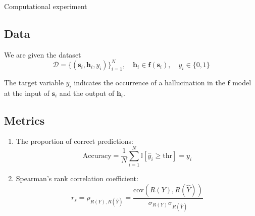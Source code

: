 \documentclass{beamer}
\begin{document}
\begin{frame}{Computational experiment}

\subsection{Data}

We are given the dataset
\[\mathcal{D} = \{(\mathbf{s}_i, \mathbf{h}_i, y_i) \}_{i=1}^N, \quad \mathbf{h}_i \in \mathbf{f}(\mathbf{s}_i), \quad y_i \in \{0, 1\}\]

The target variable $y_i$ indicates the occurrence of a hallucination in the $\mathbf{f}$ model at the input of $\mathbf{s}_i$ and the output of $\mathbf{h}_i$.

\subsection{Metrics}

\begin{enumerate}
    \item The proportion of correct predictions:
    \[\text{Accuracy} = \frac1N \sum\limits_{i=1}^N \mathbb{I}[\hat{y}_i \ge \text{thr}] = y_i\]
    \item Spearman's rank correlation coefficient:
    \[r_s= \rho_{R(Y), R(\hat{Y})} = \frac{\text{cov} (R(Y), R(\hat{Y}))}{\sigma_{R(Y)} \sigma_{R(\hat{Y})}}\]
\end{enumerate}


\end{frame}
\end{document}
